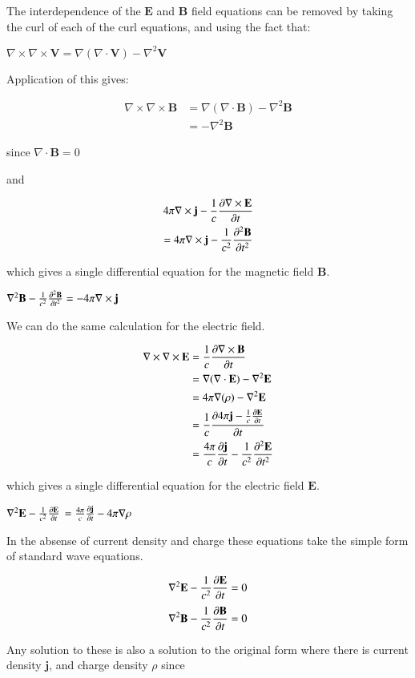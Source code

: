\documentclass{article}      %
\newcommand{\grad}[1]{\nabla#1}
\newcommand{\curl}[1]{\nabla \times #1}
\newcommand{\Curl}[1]{\nabla \times \mathbf{#1}}
\newcommand{\Diverg}[1]{\nabla \cdot \mathbf{#1}}
\newcommand{\curlCurl}[1]{\curl\Curl{#1}}
\newcommand{\delsquared}[1]{\nabla^2{#1}}
\newcommand{\Delsquared}[1]{{\nabla^2}{\mathbf{#1}}}
\newcommand{\ddt}[1]{ {{\partial{#1}} \over {\partial{t}}}}
\newcommand{\Ddt}[1]{ {{\partial{\mathbf{#1}}} \over {\partial{t}}}}
\newcommand{\Ddts}[1]{ {{\partial^2{\mathbf{#1}}} \over {\partial{t}^2}}}
\begin{document}
The interdependence of the $\mathbf{E}$ and $\mathbf{B}$ field equations can be removed by taking the
curl of each of the curl equations, and using the fact that:

$\curlCurl{V} = \grad (\Diverg V) - \Delsquared{V}$

Application of this gives:

\begin{align*}
\curlCurl{B} &= \grad (\Diverg{B}) - \Delsquared{B} \\
      	     &= 		   -\Delsquared{B}
\end{align*}

since $\Diverg{B} = 0$

and 

\begin{multline*}
4\pi \Curl{j} - {1 \over c} \ddt{\Curl{E}} \\
 = 
4\pi \Curl{j} - {1 \over c^2} {\Ddts{B}}
\end{multline*}

which gives a single differential equation for the magnetic field $\mathbf{B}$.

$\delsquared{\mathbf{B}} - {1 \over c^2} {\Ddts{B}} = - 4\pi \Curl{j}$

We can do the same calculation for the electric field.

\begin{align*}
\curlCurl{E} 		&= {1 \over c} {\ddt{\Curl{B}}} \\
			&= \grad{ (\Diverg E)} - \Delsquared{E} \\
			&= 4\pi \grad (\rho) - \Delsquared{E} \\
			&= {1 \over c} {\ddt{4\pi \mathbf{j} - {1 \over c} {\Ddt{E}}}} \\
			&= {4\pi \over c} {\Ddt{j}} - {1 \over c^2} {\Ddts{E}}
\end{align*}

which gives a single differential equation for the electric field $\mathbf{E}$.

$\Delsquared{E} - {1 \over c^2} \Ddt{E}$
$ = {4\pi \over c} \Ddt{j} - 4\pi \grad{\rho}$

In the absense of current density and charge these equations take the simple form of standard wave
equations.

\begin{equation*}
\Delsquared{E} - {1 \over c^2} \Ddt{E} = 0
\end{equation*}
\begin{equation*}
\Delsquared{B} - {1 \over c^2} \Ddt{B} = 0
\end{equation*}

Any solution to these is also a solution to the original form where there is current density $\mathbf{j}$, and 
charge density $\rho$ since 
\end{document}
